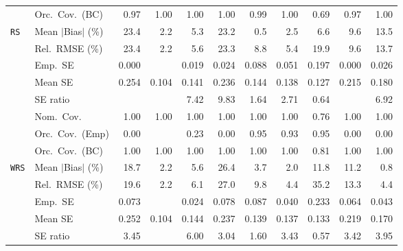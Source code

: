 \begin{landscape}
\begin{longtable}{llrrrrrrrrr}
 & Orc.\ Cov.\ (BC) & \cellcolor{rankone}0.97 & \cellcolor{rankthree}1.00 & \cellcolor{rankthree}1.00 & \cellcolor{rankthree}1.00 & \cellcolor{ranktwo}0.99 & \cellcolor{rankthree}1.00 & 0.69 & \cellcolor{rankone}0.97 & \cellcolor{rankthree}1.00 \\
\addlinespace[2pt]
\quad \texttt{RS} & Mean $|$Bias$|$ (\%) & 23.4 & \cellcolor{ranktwo}2.2 & 5.3 & 23.2 & \cellcolor{rankone}0.5 & \cellcolor{rankthree}2.5 & 6.6 & 9.6 & 13.5 \\
 & Rel.\ RMSE (\%) & 23.4 & \cellcolor{rankone}2.2 & \cellcolor{rankthree}5.6 & 23.3 & 8.8 & \cellcolor{ranktwo}5.4 & 19.9 & 9.6 & 13.7 \\
 & Emp.\ SE & 0.000 &  & 0.019 & 0.024 & 0.088 & 0.051 & 0.197 & 0.000 & 0.026 \\
 & Mean SE & 0.254 & 0.104 & 0.141 & 0.236 & 0.144 & 0.138 & 0.127 & 0.215 & 0.180 \\
 & SE ratio &  &  & 7.42 & 9.83 & \cellcolor{ranktwo}1.64 & \cellcolor{rankthree}2.71 & \cellcolor{rankone}0.64 &  & 6.92 \\
 & Nom.\ Cov. & \cellcolor{rankone}1.00 & \cellcolor{rankone}1.00 & \cellcolor{rankone}1.00 & \cellcolor{rankone}1.00 & \cellcolor{rankone}1.00 & \cellcolor{rankone}1.00 & \cellcolor{ranktwo}0.76 & \cellcolor{rankone}1.00 & \cellcolor{rankone}1.00 \\
 & Orc.\ Cov.\ (Emp) & 0.00 &  & \cellcolor{rankthree}0.23 & 0.00 & \cellcolor{rankone}0.95 & \cellcolor{ranktwo}0.93 & \cellcolor{rankone}0.95 & 0.00 & 0.00 \\
 & Orc.\ Cov.\ (BC) & \cellcolor{rankone}1.00 & \cellcolor{rankone}1.00 & \cellcolor{rankone}1.00 & \cellcolor{rankone}1.00 & \cellcolor{rankone}1.00 & \cellcolor{rankone}1.00 & \cellcolor{ranktwo}0.81 & \cellcolor{rankone}1.00 & \cellcolor{rankone}1.00 \\
\addlinespace[2pt]
\quad \texttt{WRS} & Mean $|$Bias$|$ (\%) & 18.7 & \cellcolor{rankthree}2.2 & 5.6 & 26.4 & 3.7 & \cellcolor{ranktwo}2.0 & 11.8 & 11.2 & \cellcolor{rankone}0.8 \\
 & Rel.\ RMSE (\%) & 19.6 & \cellcolor{rankone}2.2 & \cellcolor{rankthree}6.1 & 27.0 & 9.8 & \cellcolor{ranktwo}4.4 & 35.2 & 13.3 & \cellcolor{ranktwo}4.4 \\
 & Emp.\ SE & 0.073 &  & 0.024 & 0.078 & 0.087 & 0.040 & 0.233 & 0.064 & 0.043 \\
 & Mean SE & 0.252 & 0.104 & 0.144 & 0.237 & 0.139 & 0.137 & 0.133 & 0.219 & 0.170 \\
 & SE ratio & 3.45 &  & 6.00 & \cellcolor{rankthree}3.04 & \cellcolor{ranktwo}1.60 & 3.43 & \cellcolor{rankone}0.57 & 3.42 & 3.95 \\

\end{longtable}
\end{landscape}
